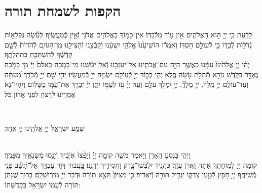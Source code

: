 \documentclass[twoside, openany, parskip=half, 11pt]{book}
\begin{document}
\chapter[הקפות לשמחת תורה]{ הקפות לשמחת תורה }


לָדַ֔עַת כִּ֥י יְיָ֖ ה֣וּא הָאֱלֹהִ֑ים אֵ֥ין ע֖וֹד מִלְּֿֿבַדּֽוֹ׃ \hfill \break
אֵין־כָּמ֖וֹךָ בָאֱלֹהִ֥ים אֲדֹנָ֗י וְֿאֵ֣ין כְּֽֿמַעֲשֶֽׂיךָ׃ \hfill \break
לְעֹ֘שֵׂ֤ה נִפְלָא֣וֹת גְּֿדֹל֣וֹת לְֿבַדּ֑וֹ כִּ֖י לְֿעוֹלָ֣ם חַסְדּֽוֹ׃ \hfill \break
וְאִמְר֕וּ הוֹשִׁיעֵ֙נוּ֙ אֱלֹהֵ֣י יִשְׁעֵ֔נוּ וְֿקַבְּֿֿצֵ֥נוּ וְֿהַצִּילֵ֖נוּ מִן־הַגּוֹיִ֑ם לְֿהֹדוֹת֙ לְֿשֵׁ֣ם קָדְֿשֶׁ֔ךָ לְֿהִשְׁתַּבֵּ֖חַ בִּתְהִלָּתֶֽךָ׃\\
יְהִ֨י יְיָ֤ אֱלֹהֵ֙ינוּ֙ עִמָּ֔נוּ כַּאֲשֶׁ֥ר הָיָ֖ה עִם־אֲבֹתֵ֑ינוּ אַל־יַעַזְבֵ֖נוּ וְֿאַֽל־יִטְּֿשֵֽׁנוּ׃ \hfill \break
מִֽי־כָמֹ֤כָה בָּֽאֵלִם֙ יְיָ֔ מִ֥י כָּמֹ֖כָה נֶאְדָּ֣ר בַּקֹּ֑דֶשׁ נוֹרָ֥א תְֿהִלֹּ֖ת עֹ֥שֵׂה פֶֽלֶא׃ \hfill \break
יְהִ֤י כְב֣וֹד יְיָ֣ לְֿעוֹלָ֑ם יִשְׂמַ֖ח יְיָ֣ בְּֿמַעֲשָֽׂיו׃ \hfill \break
יְהִ֤י שֵׁ֣ם יְיָ֣ מְֿבֹרָ֑ךְ מֵ֝עַתָּ֗ה וְֿעַד־עוֹלָֽם׃ \hfill \break
יְיָ֣ מֶֽלֶךְ֘, יְיָ֣ מָלָךְֿ֘, יְיָ֥ יִמְלֹ֖ךְ עֹלָ֥ם וָעֶֽד׃ \hfill \break
יְיָ֗ עֹ֖ז לְעַמּ֣וֹ יִתֵּ֑ן יְיָ֓ יְֿבָרֵ֖ךְ אֶת־עַמּ֣וֹ בַשָּׁלֽוֹם׃ \hfill \break
וְיִהְיוּ־נָא אֲמָרֵֽינוּ לְֿרָצוֹן לִפְנֵי אֲדוֹן כֹּל׃ \hfill \break

\vspace{-1.3\baselineskip}

\\
\begin{large}
	שְׁמַ֖ע יִשְׂרָאֵ֑ל יְיָ֥ אֱלֹהֵ֖ינוּ יְיָ֥ אֶחָֽד׃
\end{large}

\\
וַיְהִ֛י בִּנְסֹ֥עַ הָֽאָרֹ֖ן וַיֹּ֣אמֶר מֹשֶׁ֑ה קוּמָ֣ה יְיָ֗ וְֿיָפֻ֨צוּ֙ אֹֽיְֿבֶ֔יךָ וְֿיָנֻ֥סוּ מְֿשַׂנְאֶ֖יךָ מִפָּנֶֽיךָ׃\\
קוּמָה יְיָ לִמְוּחָתֶֽךָ אַתָה וַאֲרֹן עֻזֶּֽךָ׃ \hfill \break
כֹּהֲנֶ֥יךָ יִלְבְּֿֿשׁוּ־צֶ֑דֶק וַחֲסִידֶ֥יךָ יְֿרַנֵּֽנוּ׃ \hfill \break
בַּֽ֭עֲבוּר דָּוִ֣ד עַבְדֶּ֑ךָ אַל־תָּ֝שֵׁ֗ב פְּֿנֵ֣י מְֿשִׁיחֶֽךָ׃ \hfill \break
יְיָ֥ חָפֵ֖ץ לְֿמַ֣עַן צִדְק֑וֹ יַגְדִּ֥יל תּוֹרָ֖ה וְֿיַאְדִּֽיר׃ \hfill \break
כִּ֤י מִצִּיּוֹן֙ תֵּצֵ֣א תוֹרָ֔ה וּדְבַר־יְיָ֖ מִירֽוּשָׁלָֽםִ׃ \hfill \break
בָּרוּךְ שֶׁנָּתַן תּוֹרָה לְֿעַמּוֹ יִשְׂרָאֵל בִּקְדֻשָּׁתוֹ: \hfill \break
\end{document}
